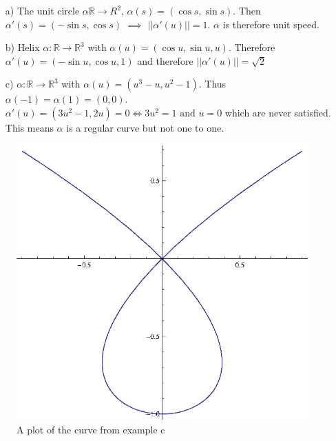 \begin{itemize}

\item[a)] The unit circle $\alpha \mathbb{R} \rightarrow R^2$, $\alpha (s) = (\cos s, \sin s)$. Then $\alpha ' (s) = (-\sin s, \cos s)$ $\implies$ $||\alpha ' (u) || = 1$. $\alpha$ is therefore unit speed.
\item[b)] Helix $\alpha : \mathbb{R} \rightarrow \mathbb{R}^3$ with $\alpha (u) = (\cos u, \sin u, u)$. Therefore $\alpha ' (u) = (- \sin u, \cos u, 1)$ and therefore $||\alpha ' (u) || = \sqrt{2}$
\item[c)] $\alpha : \mathbb{R} \rightarrow \mathbb{R}^3$ with $\alpha (u) = (u^3 - u, u^2 -1)$. Thus $\alpha (-1) = \alpha(1) = (0,0)$. $\alpha ' (u) = (3u^2 - 1, 2u) = 0 \Leftrightarrow 3u^2 = 1 \, \, \text{and} \, \, u = 0$ which are never satisfied. This means $\alpha$ is a regular curve but not one to one.

\end{itemize}

\begin{figure}[h]
\centering
\includegraphics{img/lect1-1.eps}
\caption{A plot of the curve from example c}
\end{figure}

